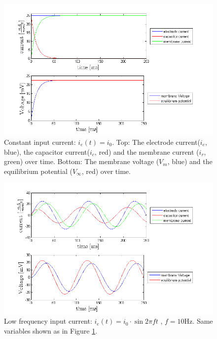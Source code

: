 \documentclass{scrartcl}
\begin{document}
\begin{figure}[h]
\centering
\includegraphics[trim = {1.3cm 0 2cm 0.9cm}, width=\textwidth, clip]{../pics/constant}
\caption{Constant input current: $i_e(t) = i_0$. Top: The electrode current($i_e$, blue), the capacitor current($i_c$, red) and the membrane current ($i_r$, green) over time. Bottom: The membrane voltage ($V_m$, blue) and the equilibrium potential ($V_\infty$, red) over time.}
\label{constant}
\end{figure}


\begin{figure}
\centering
\includegraphics[trim = {1.3cm 0 2cm 0.9cm}, width=\textwidth, clip]{../pics/low}
\caption{Low frequency input current: $i_e(t) = i_0 \cdot \sin{2\pi f t}$ , $f = 10\si{\hertz}$. Same variables shown as in Figure \ref{constant}.}
\label{low}
\end{figure}
\end{document}
